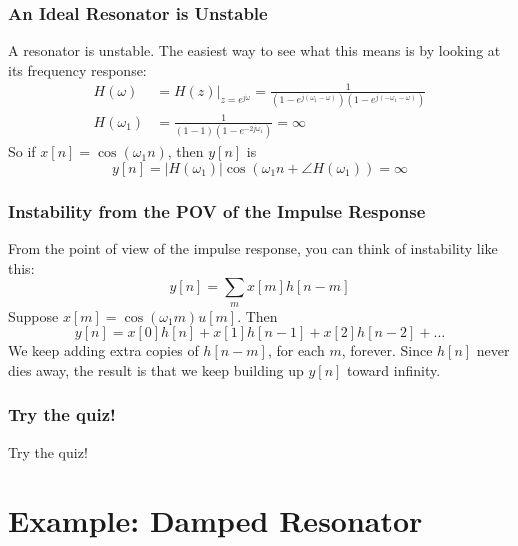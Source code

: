 \documentclass{beamer}
\begin{document}
\begin{frame}
  \centerline{}
\end{frame}

\begin{frame}
  \frametitle{An Ideal  Resonator is Unstable}

  A resonator is unstable.  The easiest way to see what this means is
  by looking at its frequency response:
  \begin{align*}
    H(\omega) &= H(z)\vert_{z=e^{j\omega}} = \frac{1}{(1-e^{j(\omega_1-\omega)})(1-e^{j(-\omega_1-\omega)})}\\
    H(\omega_1) &= \frac{1}{(1-1)(1-e^{-2j\omega_1})} = \infty
  \end{align*}
  So if $x[n]=\cos(\omega_1 n)$, then $y[n]$ is
  \begin{displaymath}
    y[n] = |H(\omega_1)|\cos\left(\omega_1 n+\angle H(\omega_1)\right) = \infty
  \end{displaymath}
\end{frame}

\begin{frame}
  \centerline{}
\end{frame}

\begin{frame}
  \frametitle{Instability from the POV of the Impulse Response}
  From the point of view of the impulse response, you can think of instability like this:
  \[
  y[n] = \sum_m x[m]h[n-m]
  \]
  Suppose $x[m] = \cos(\omega_1 m)u[m]$.   Then
  \[
  y[n] = x[0]h[n] + x[1]h[n-1] + x[2]h[n-2] + \ldots
  \]
  We keep adding extra copies of $h[n-m]$, for each $m$, forever.
  Since $h[n]$ never dies away, the result is that we keep building up
  $y[n]$ toward infinity.
\end{frame}

\begin{frame}
  \centerline{}
\end{frame}

\begin{frame}
  \frametitle{Try the quiz!}

  Try the quiz!
\end{frame}

\section[Damped]{Example: Damped Resonator}
\setcounter{subsection}{1}
\end{document}
